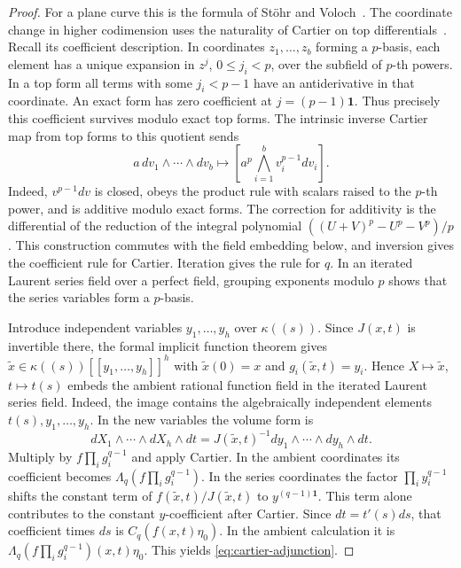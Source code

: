 \begin{proof}
For a plane curve this is the formula of St\"ohr and
Voloch~\cite[Theorem~1.1]{StoehrVoloch}. The coordinate change in
higher codimension uses the naturality of Cartier on top
differentials~\cite{Cartier,Katz}. Recall its coefficient description.
In coordinates $z_1,\ldots,z_b$ forming a $p$-basis, each element
has a unique expansion in $z^j$, $0\le j_i<p$, over the subfield
of $p$-th powers. In a top form all terms with some $j_i<p-1$ have
an antiderivative in that coordinate. An exact form has zero
coefficient at $j=(p-1)\mathbf1$. Thus precisely this coefficient
survives modulo exact top forms. The intrinsic inverse Cartier map
from top forms to this quotient sends
\[
 a\,dv_1\wedge\cdots\wedge dv_b\longmapsto
 \left[a^p\bigwedge_{i=1}^b v_i^{p-1}dv_i\right].
\]
Indeed, $v^{p-1}dv$ is closed, obeys the product rule with scalars
raised to the $p$-th power, and is additive modulo exact forms.
The correction for additivity is the differential of the reduction
of the integral polynomial $((U+V)^p-U^p-V^p)/p$. This construction
commutes with the field embedding below, and inversion gives the
coefficient rule for Cartier. Iteration gives the rule for $q$.
In an iterated Laurent series field over a perfect field, grouping
exponents modulo $p$ shows that the series variables form a $p$-basis.

Introduce independent variables $y_1,\ldots,y_h$ over $\kappa((s))$.
Since $J(x,t)$ is invertible there, the formal implicit function
theorem gives $\widetilde x\in\kappa((s))[[y_1,\ldots,y_h]]^h$
with $\widetilde x(0)=x$ and $g_i(\widetilde x,t)=y_i$.
Hence $X\mapsto\widetilde x$, $t\mapsto t(s)$ embeds the ambient
rational function field in the iterated Laurent series field. Indeed,
the image contains the algebraically independent elements
$t(s),y_1,\ldots,y_h$. In the new variables the volume form is
\[
 dX_1\wedge\cdots\wedge dX_h\wedge dt
    = J(\widetilde x,t)^{-1}dy_1\wedge\cdots\wedge dy_h\wedge dt .
\]
Multiply by $f\prod_i g_i^{q-1}$ and apply Cartier. In the ambient
coordinates its coefficient becomes $\Lambda_q(f\prod_i g_i^{q-1})$.
In the series coordinates the factor $\prod_i y_i^{q-1}$ shifts
the constant term of $f(\widetilde x,t)/J(\widetilde x,t)$ to
$y^{(q-1)\mathbf1}$. This term alone contributes to the constant
$y$-coefficient after Cartier. Since $dt=t'(s)ds$, that coefficient
times $ds$ is $C_q(f(x,t)\eta_0)$. In the ambient calculation it is
$\Lambda_q(f\prod_i g_i^{q-1})(x,t)\eta_0$. This yields
\eqref{eq:cartier-adjunction}.
\end{proof}

